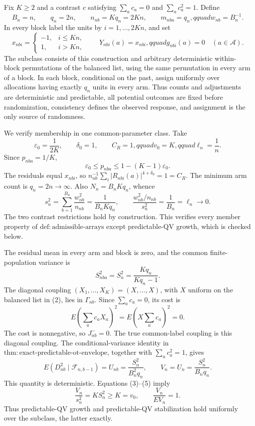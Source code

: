 Fix \(K\ge2\) and a contrast \(c\) satisfying \(\sum_ac_a=0\) and \(\sum_ac_a^2=1\). Define
\[
B_n=n,\qquad q_n=2n,\qquad n_{nb}=Kq_n=2Kn,
\qquad m_{nba}=q_n,qquad w_{nb}=B_n^{-1}.
\tag{1}
\]
In every block label the units by \(i=1,\ldots,2Kn\), and set
\[
x_{nbi}=\begin{cases}-1,&i\le Kn,\\1,&i>Kn,\end{cases}
\qquad
Y_{nbi}(a)=x_{nbi},qquad g_{nbi}(a)=0
\quad(a\in\mathcal A).
\tag{2}
\]
The subclass consists of this construction and arbitrary deterministic within-block permutations of the balanced list, using the same permutation in every arm of a block. In each block, conditional on the past, assign uniformly over allocations having exactly \(q_n\) units in every arm. Thus counts and adjustments are deterministic and predictable, all potential outcomes are fixed before randomization, consistency defines the observed response, and assignment is the only source of randomness.

We verify membership in one common-parameter class. Take
\[
\varepsilon_0=\frac1{2K},\qquad \delta_0=1,
\qquad C_R=1,qquad v_0=K,qquad \ell_n=\frac1n.
\]
Since \(p_{nba}=1/K\),
\[
\varepsilon_0\le p_{nba}\le1-(K-1)\varepsilon_0.
\]
The residuals equal \(x_{nbi}\), so
\(n_{nb}^{-1}\sum_i|R_{nbi}(a)|^{4+\delta_0}=1=C_R\). The minimum arm count is \(q_n=2n\to\infty\). Also \(N_n=B_nKq_n\), whence
\[
s_n^2=\sum_{b=1}^{B_n}\frac{w_{nb}^2}{n_{nb}}
=\frac1{B_nKq_n},
\qquad
\frac{w_{nb}^2/n_{nb}}{s_n^2}
=\frac1{B_n}=\ell_n\longrightarrow0.
\tag{3}
\]
The two contrast restrictions hold by construction. This verifies every member property of \(\mathrm{def:admissible\text{-}arrays}\) except predictable-QV growth, which is checked below.

The residual mean in every arm and block is zero, and the common finite-population variance is
\[
S_{nba}^2=S_n^2=\frac{Kq_n}{Kq_n-1}.
\tag{4}
\]
The diagonal coupling \((X_1,\ldots,X_K)=(X,\ldots,X)\), with \(X\) uniform on the balanced list in (2), lies in \(\Gamma_{nb}\). Since \(\sum_ac_a=0\), its cost is
\[
E\left(\sum_ac_aX_a\right)^2
=E\left(X\sum_ac_a\right)^2=0.
\]
The cost is nonnegative, so \(J_{nb}^{-}=0\). The true common-label coupling is this diagonal coupling. The conditional-variance identity in
\(\mathrm{thm:exact\text{-}predictable\text{-}ot\text{-}envelope}\), together with \(\sum_ac_a^2=1\), gives
\[
E(D_{nb}^2\mid\mathcal F_{n,b-1})
=U_{nb}=\frac{S_n^2}{B_n^2q_n},
\qquad
V_n=U_n=\frac{S_n^2}{B_nq_n}.
\tag{5}
\]
This quantity is deterministic. Equations (3)--(5) imply
\[
\frac{V_n}{s_n^2}=KS_n^2\ge K=v_0,
\qquad
\frac{V_n}{E V_n}=1.
\tag{6}
\]
Thus predictable-QV growth and predictable-QV stabilization hold uniformly over the subclass, the latter exactly.

